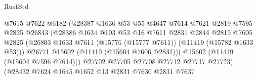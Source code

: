 \begin{lexlean}{RustStd}
\begin{coremodule}
                                          @7615
                                          @7622
                                          @6182
                                          (@28387
                                            @1636
                                            @53
                                            @55
                                            @4647
                                            @7614
                                            @7621
                                            @2819
                                            @7595
                                            @2825
                                            @26843
                                            (@28386
                                              @1634
                                              @103
                                              @53
                                              @16
                                              @7611
                                              @2831
                                              @2844
                                              @2819
                                              @7605
                                              @2825
                                              (@26803
                                                @1633
                                                @7611
                                                (@15776 (@15777 @7611))
                                                (@11419 (@15782 @1633 @53)))
                                              @26771
                                              @15602
                                              (@11419 (@15604 @7606 @2831)))
                                            @15602
                                            (@11419 (@15604 @7596 @7614)))
                                          @27702
                                          @27705
                                          @27708
                                          @27712
                                          @27717
                                          @27723)
                                        (@28432
                                          @7624
                                          @1645
                                          @1652
                                          @13
                                          @2831
                                          @7630
                                          @2831
                                          @7637

\end{coremodule}
\end{lexlean}
